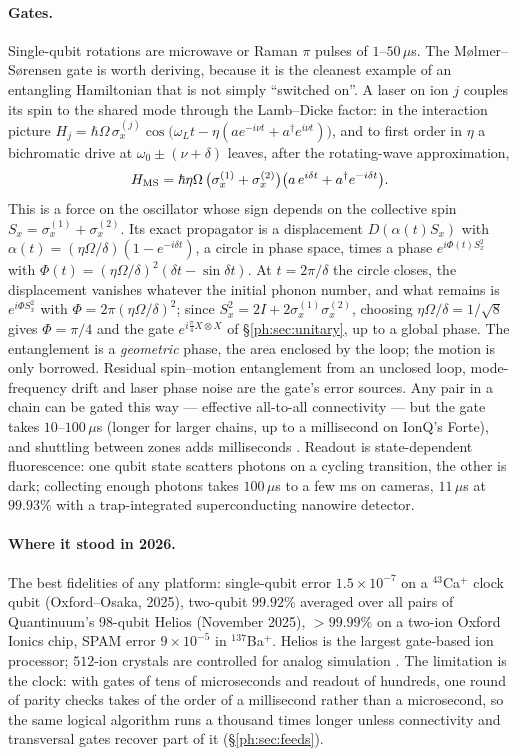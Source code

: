\paragraph{Gates.} Single-qubit rotations are microwave or Raman $\pi$ pulses of $1$--$50\,\mu$s.
The M\o lmer--S\o rensen gate is worth deriving, because it is the cleanest example of an
entangling Hamiltonian that is not simply ``switched on''. A laser on ion $j$ couples its spin to
the shared mode through the Lamb--Dicke factor: in the interaction picture
$H_j=\hbar\Omega\,\sigma_x^{(j)}\cos\big(\omega_Lt-\eta(ae^{-i\nu t}+a^\dagger e^{i\nu t})\big)$,
and to first order in $\eta$ a bichromatic drive at $\omega_0\pm(\nu+\delta)$ leaves, after the
rotating-wave approximation,
\[ H_{\rm MS}=\hbar\eta\Omega\,\big(\sigma_x^{(1)}+\sigma_x^{(2)}\big)\big(a\,e^{i\delta t}+a^\dagger e^{-i\delta t}\big) . \]
This is a force on the oscillator whose sign depends on the collective spin $S_x=\sigma_x^{(1)}+\sigma_x^{(2)}$.
Its exact propagator is a displacement $D(\alpha(t)S_x)$ with
$\alpha(t)=(\eta\Omega/\delta)(1-e^{-i\delta t})$, a circle in phase space, times a phase
$e^{i\Phi(t)S_x^2}$ with $\Phi(t)=(\eta\Omega/\delta)^2(\delta t-\sin\delta t)$. At
$t=2\pi/\delta$ the circle closes, the displacement vanishes whatever the initial phonon number,
and what remains is $e^{i\Phi S_x^2}$ with $\Phi=2\pi(\eta\Omega/\delta)^2$; since
$S_x^2=2I+2\sigma_x^{(1)}\sigma_x^{(2)}$, choosing $\eta\Omega/\delta=1/\sqrt8$ gives
$\Phi=\pi/4$ and the gate $e^{i\frac\pi4X\otimes X}$ of \S\ref{ph:sec:unitary}, up to a global
phase. The entanglement is a \emph{geometric} phase, the area enclosed by the loop; the motion is
only borrowed. Residual spin--motion entanglement from an unclosed loop, mode-frequency drift
and laser phase noise are the gate's error sources. Any pair in a chain can be gated this way --- effective all-to-all connectivity --- but
the gate takes $10$--$100\,\mu$s (longer for larger chains, up to a millisecond on IonQ's Forte),
and shuttling between zones adds milliseconds \cite{ph:uqt26}. Readout is state-dependent
fluorescence: one qubit state scatters photons on a cycling transition, the other is dark;
collecting enough photons takes $100\,\mu$s to a few ms on cameras, $11\,\mu$s at $99.93\%$ with a
trap-integrated superconducting nanowire detector.

\paragraph{Where it stood in 2026.} The best fidelities of any platform: single-qubit error
$1.5\times10^{-7}$ on a $^{43}$Ca$^+$ clock qubit (Oxford--Osaka, 2025), two-qubit $99.92\%$
averaged over all pairs of Quantinuum's 98-qubit Helios (November 2025), $>99.99\%$ on a two-ion
Oxford Ionics chip, SPAM error $9\times10^{-5}$ in $^{137}$Ba$^+$. Helios is the largest
gate-based ion processor; $512$-ion crystals are controlled for analog simulation
\cite{ph:uqt26,ph:helios}. The limitation is the clock: with gates of tens of microseconds and
readout of hundreds, one round of parity checks takes of the order of a millisecond rather than a
microsecond, so the same logical algorithm runs a thousand times longer unless connectivity and
transversal gates recover part of it (\S\ref{ph:sec:feeds}).

